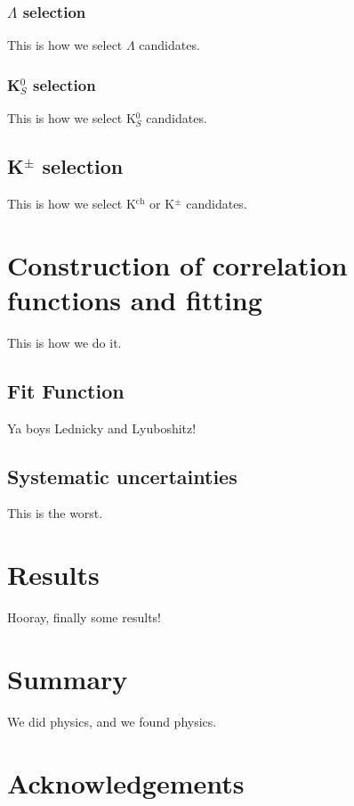 \documentclass[ALICE,manyauthors]{cernphprep}
\begin{document}
\subsubsection{$\Lambda$ selection}
\label{sec:LambdaSelection}
This is how we select $\Lambda$ candidates.

\subsubsection{K$^{0}_{S}$ selection}
\label{sec:K0sSelection}
This is how we select K$^{0}_{S}$ candidates.

\subsection{K$^{\pm}$ selection}
\label{sec:KchSelection}
This is how we select K$^{\mathrm{ch}}$ or K$^{\pm}$ candidates.

\section{Construction of correlation functions and fitting}
\label{sec:CfConstructionAndFitting}
This is how we do it.

\subsection{Fit Function}
\label{sec:FitFunction}
Ya boys Lednicky and Lyuboshitz!

\subsection{Systematic uncertainties}
\label{sec:SysErrs}
This is the worst.

\section{Results}
\label{sec:Results}
Hooray, finally some results!

\section{Summary}
\label{sec:Summary}
We did physics, and we found physics.

\newenvironment{acknowledgement}{\relax}{\relax}
\begin{acknowledgement}
\section*{Acknowledgements}
\end{acknowledgement}
\end{document}
